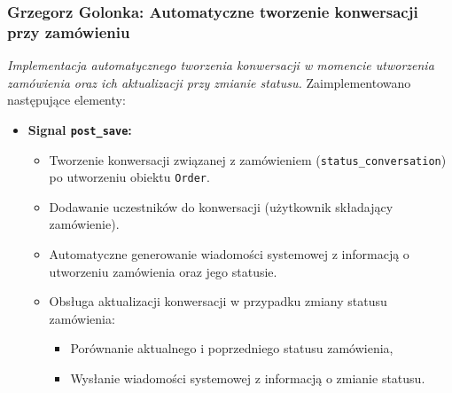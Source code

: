 \documentclass[12pt,a4paper,oneside]{article}
\theoremstyle{definition}
\numberwithin{equation}{section}
\begin{document}
\subsubsection{Grzegorz Golonka: Automatyczne tworzenie konwersacji przy zamówieniu}
\label{section:1.3.31}
\textit{
Implementacja automatycznego tworzenia konwersacji w momencie utworzenia zamówienia oraz ich aktualizacji przy zmianie statusu.
}
Zaimplementowano następujące elementy:
\begin{itemize}
    \item \textbf{Signal \texttt{post\_save}:}
    \begin{itemize}
        \item Tworzenie konwersacji związanej z zamówieniem (\texttt{status\_conversation}) po utworzeniu obiektu \texttt{Order}.
        \item Dodawanie uczestników do konwersacji (użytkownik składający zamówienie).
        \item Automatyczne generowanie wiadomości systemowej z informacją o utworzeniu zamówienia oraz jego statusie.
        \item Obsługa aktualizacji konwersacji w przypadku zmiany statusu zamówienia:
        \begin{itemize}
            \item Porównanie aktualnego i poprzedniego statusu zamówienia,
            \item Wysłanie wiadomości systemowej z informacją o zmianie statusu.
        \end{itemize}
    \end{itemize}
\end{itemize}
%
%
\end{document}
